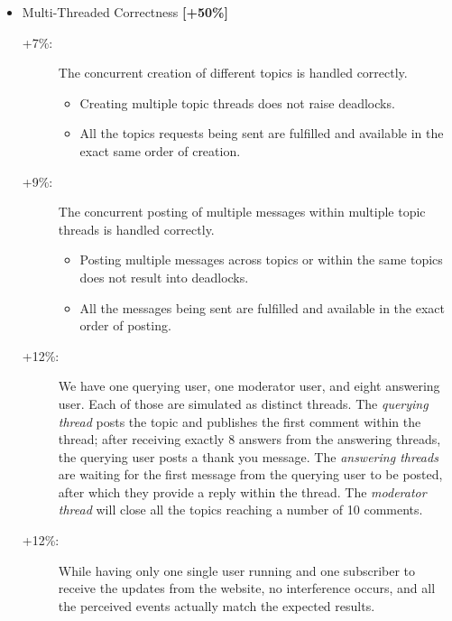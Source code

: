 \documentclass{article}
\begin{document}
\begin{itemize}
\begin{description}
		\end{description}


	\item  Multi-Threaded Correctness \textbf{[+50\%]}
\begin{description}
	\item [+7\%:] The concurrent creation of different topics is handled correctly.
\begin{itemize}
\item Creating multiple topic threads does not raise deadlocks.
\item All the topics requests being sent are fulfilled and available in the exact same order of creation.
\end{itemize}
	\item [+9\%:] The concurrent posting of multiple messages within multiple topic threads is handled correctly.
\begin{itemize}
\item Posting multiple messages across topics or within the same topics does not result into deadlocks.
\item All the messages being sent are fulfilled and available in the exact order of posting.
\end{itemize}
\item [+12\%:] We have one querying user, one moderator user, and eight answering user. Each of those are simulated as distinct threads. The \textit{querying thread} posts the topic and publishes the first comment within the thread; after receiving exactly 8 answers from the answering threads, the querying user posts a thank you message. The \textit{answering threads} are waiting for the first message from the querying user to be posted, after which they provide a reply within the thread. The \textit{moderator thread}  will close all the topics reaching a number of 10 comments.   

\item [+12\%:] While having only one single user running and one subscriber to receive the updates from the website, no interference occurs, and all the perceived events actually match the expected results.
\end{description}



\end{itemize}
\end{document}
